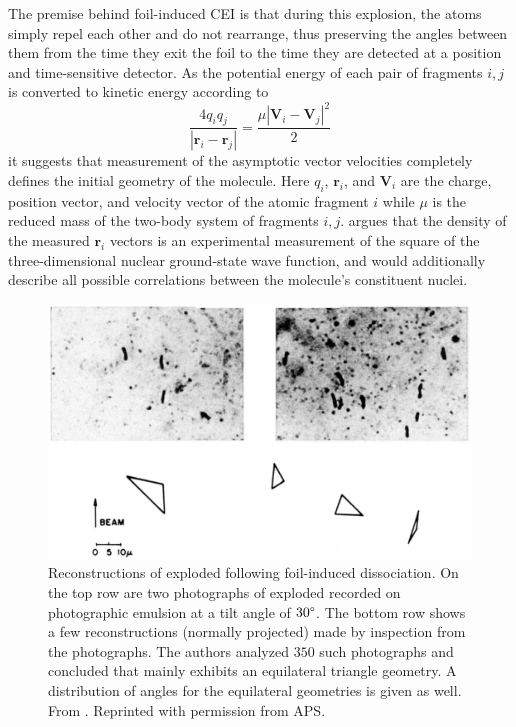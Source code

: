 The premise behind foil-induced CEI is that during this explosion, the atoms simply repel each other and do not rearrange, thus preserving the angles between them from the time they exit the foil to the time they are detected at a position and time-sensitive detector. As the potential energy of each pair of fragments $i,j$ is converted to kinetic energy according to
\begin{equation} \label{eq:foilCEI}
\frac{4q_i q_j}{|\mathbf{r}_i - \mathbf{r}_j|} = \frac{\mu|\mathbf{V}_i - \mathbf{V}_j|^2}{2}
\end{equation}
it suggests that measurement of the asymptotic vector velocities completely defines the initial geometry of the molecule. Here $q_i$, $\mathbf{r}_i$, and $\mathbf{V}_i$ are the charge, position vector, and velocity vector of the atomic fragment $i$ while $\mu$ is the reduced mass of the two-body system of fragments $i,j$. \citet{Vager89} argues that the density of the measured $\mathbf{r}_i$ vectors is an experimental measurement of the square of the three-dimensional nuclear ground-state wave function, and would additionally describe all possible correlations between the molecule's constituent nuclei.

\begin{figure}
  \centering
  \includegraphics[width=\textwidth]{gfx/HydrogenTrimerReconstruction}
  \caption[Reconstructions of exploded  following foil-induced dissociation.]
  {Reconstructions of exploded  following foil-induced dissociation. On the top row are two photographs of exploded  recorded on photographic emulsion at a tilt angle of $30\degree$. The bottom row shows a few reconstructions (normally projected) made by inspection from the photographs. The authors analyzed $350$ such photographs and concluded that  mainly exhibits an equilateral triangle geometry. A distribution of angles for the equilateral geometries is given as well. From \citet{Gaillard78}. Reprinted with permission from APS.}
  \label{fig:hydrogenTrimer}
\end{figure}

